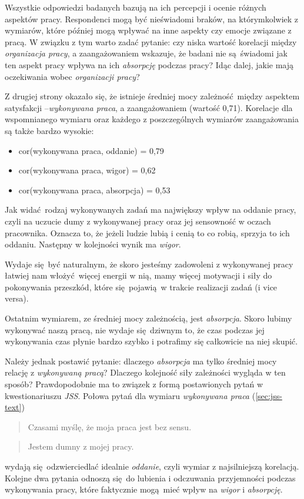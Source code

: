 Wszystkie odpowiedzi badanych bazują na ich percepcji i ocenie różnych aspektów pracy. Respondenci mogą być nieświadomi braków, na którymkolwiek z wymiarów, które później mogą wpływać na inne aspekty czy emocje związane z pracą. W związku z tym warto zadać pytanie: czy niska wartość korelacji między \textit{organizacja pracy}, a zaangażowaniem wskazuje, że badani nie są świadomi jak ten aspekt pracy wpływa na ich \textit{absorpcję} podczas pracy? Idąc dalej, jakie mają oczekiwania wobec
\textit{organizacji pracy}?

Z drugiej strony okazało się, że istnieje średniej mocy zależność między aspektem satysfakcji --\textit{wykonywana praca}, a zaangażowaniem (wartość 0,71). Korelacje dla wspomnianego wymiaru oraz każdego z poszczególnych wymiarów zaangażowania są także bardzo wysokie:
\begin{itemize}
  \item cor(wykonywana praca, oddanie) = 0,79
  \item cor(wykonywana praca, wigor) = 0,62
  \item cor(wykonywana praca, absorpcja) = 0,53
\end{itemize}
Jak widać rodzaj wykonywanych zadań ma największy wpływ na oddanie pracy, czyli na uczucie dumy z wykonywanej pracy oraz jej sensowność w oczach pracownika. Oznacza to, że jeżeli ludzie lubią i cenią to co robią, sprzyja to ich oddaniu. Następny w kolejności wynik ma \textit{wigor}. 

Wydaje się być naturalnym, że skoro jesteśmy zadowoleni z wykonywanej pracy łatwiej nam włożyć więcej energii w nią, mamy więcej motywacji i siły do pokonywania przeszkód, które się pojawią w trakcie
realizacji zadań (i vice versa). 

Ostatnim wymiarem, ze średniej mocy zależnością, jest \textit{absorpcja}. Skoro lubimy wykonywać naszą pracą, nie wydaje się dziwnym to, że czas podczas jej wykonywania czas płynie bardzo szybko i potrafimy się całkowicie na niej skupić. 

Należy jednak postawić pytanie: dlaczego \textit{absorpcja} ma tylko średniej mocy relację z \textit{wykonywaną pracą}? Dlaczego kolejność siły zależności wygląda w ten sposób? Prawdopodobnie ma to związek z formą postawionych pytań w kwestionariuszu \emph{JSS}. Połowa pytań dla wymiaru
\textit{wykonywana praca} (\ref{sec:jss-text})
\begin{quote}
  Czasami myślę, że moja praca jest bez sensu.
\end{quote}
\begin{quote}
  Jestem dumny z mojej pracy.
\end{quote}
wydają się odzwierciedlać idealnie \textit{oddanie}, czyli wymiar z najsilniejszą korelacją. Kolejne dwa pytania odnoszą się do lubienia i odczuwania przyjemności podczas wykonywania pracy, które faktycznie mogą mieć wpływ na \textit{wigor} i \textit{absorpcję}.


